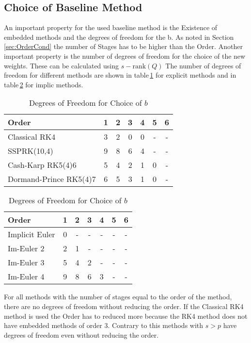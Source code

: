 \documentclass{article}
\begin{document}
\subsection{Choice of Baseline Method}
An important property for the used baseline method is the Existence of embedded methods and the degrees of freedom for the b.
As noted in Section\,\ref{sec:OrderCond} the number of Stages has to be higher than the Order. 
Another important property is the number of degrees of freedom for the choice of the new weights. 
These can be calculated using $s-\mathrm{rank}(Q)$%
The number of degrees of freedom for different methods are shown in table\,\ref{table:DOF_exp} for explicit methods and in table\,\ref{table:DOF_imp} for implic methods.

\begin{table}[h!]
\centering    %
\begin{tabular}{|l |c c c c c c |} 
 \hline 
Order &1&2&3&4&5&6 \\ 
 \hline Classical RK4&3&2&0&0& - & -  \\ 
 SSPRK(10,4)&9&8&6&4& - & -  \\ 
 Cash-Karp RK5(4)6&5&4&2&1&0& -  \\ 
 Dormand-Prince RK5(4)7&6&5&3&1&0& -  \\ 
 \hline 
 \end{tabular}
 \caption{Degrees of Freedom for Choice of $b$} %
 \label{table:DOF_exp}
 \end{table}
 
 \begin{table}[h!]
\centering   %
 \begin{tabular}{|l |c c c c c c |} 
 \hline 
Order &1&2&3&4&5&6 \\ 
 \hline Implicit Euler&0& - & - & - & - & -  \\ 
 Im-Euler 2&2&1& - & - & - & -  \\ 
 Im-Euler 3&5&4&2& - & - & -  \\ 
 Im-Euler 4&9&8&6&3& - & -  \\ 
 \hline 
 \end{tabular}
 \caption{Degrees of Freedom for Choice of $b$} %
 \label{table:DOF_imp}
 \end{table}


For all methods with the number of stages equal to the order of the method, there are no degrees of freedom without reducing the order. 
If the Classical RK4 method is used the Order has to reduced more because the RK4 method does not have embedded methods of order 3.
Contrary to this methods with $s > p$ have degrees of freedom even without reducing the order. 
\end{document}
